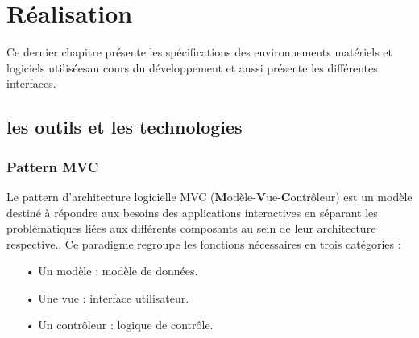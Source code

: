 \chapter{Réalisation}
\vspace{5cm}
\large{Ce dernier chapitre présente les spécifications des environnements matériels et logiciels utiliséesau cours du développement et aussi présente les différentes interfaces.\\}


\newpage

\section{les outils et les technologies}

\subsection{Pattern MVC}
Le pattern d'architecture logicielle MVC (\textbf{M}odèle-\textbf{V}ue-\textbf{C}ontrôleur) est un modèle destiné à répondre aux besoins des applications interactives en séparant les problématiques liées aux différents composants au sein de leur architecture respective..
Ce paradigme regroupe les fonctions nécessaires en trois catégories :\\
\begin{itemize}
\item[•] Un modèle : modèle de données.
\item[•] Une vue : interface utilisateur.
\item[•] Un contrôleur : logique de contrôle.\vspace{0.1cm}\\
\end{itemize}

\begin{minipage}{\linewidth}
	\label{f3}%
\end{minipage}\\



